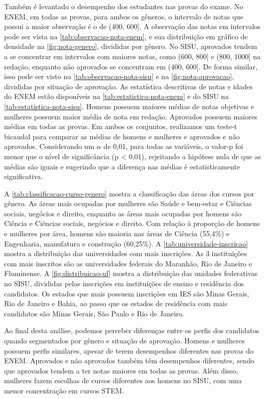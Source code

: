 Também é levantado o desempenho dos estudantes nas provas do exame. No ENEM, em todas as provas, para ambos os gêneros, o intervalo de notas que possui a maior observação é o de (400, 600]. A observação das notas em intervalos pode ser vista na \autoref{tab:observacao-nota-enem}, e sua distribuição em gráfico de densidade na \autoref{fig:nota-genero}, divididas por gênero. No SISU, aprovados tendem a se concentrar em intervalos com maiores notas, como (600, 800] e (800, 1000] na redação, enquanto não aprovados se concentram em (400, 600]. De forma similar, isso pode ser visto na \autoref{tab:observacao-nota-sisu} e na \autoref{fig:nota-aprovacao}, divididas por situação de aprovação. As estatística descritivas de notas e idades do ENEM estão disponíveis na \autoref{tab:estatistica-nota-enem} e do SISU na \autoref{tab:estatistica-nota-sisu}. Homens possuem maiores médias de notas objetivas e mulheres possuem maior média de nota em redação. Aprovados possuem maiores médias em todas as provas. Em ambos os conjuntos, realizamos um teste-t bicaudal para comparar as médias de homens e mulheres e aprovados e não aprovados. Considerando um $\alpha$ de 0,01, para todas as variáveis, o valor-p foi menor que o nível de significância (p < 0,01), rejeitando a hipótese nula de que as médias são iguais e sugerindo que a diferença nas médias é estatisticamente significativa.

A \autoref{tab:classificacao-curso-genero} mostra a classificação das áreas dos cursos por gênero. As áreas mais ocupadas por mulheres são Saúde e bem-estar e Ciências sociais, negócios e direito, enquanto as áreas mais ocupadas por homens são Ciência e Ciências sociais, negócios e direito. Com relação à proporção de homens e mulheres por área, homens são maioria nas áreas de Ciência (55,4\%) e Engenharia, manufatura e construção (60,25\%). A \autoref{tab:universidade-inscricao} mostra a distribuição das universidades com mais inscrições. As 3 instituições com mais inscritos são as universidades federais do Maranhão, Rio de Janeiro e Fluminense. A \autoref{fig:distribuicao-uf} mostra a distribuição das unidades federativas no SISU, divididas pelas inscrições em instituições de ensino e residência dos candidatos. Os estados que mais possuem inscrições em IES são Minas Gerais, Rio de Janeiro e Bahia, ao passo que os estados de residência com mais candidatos são Minas Gerais, São Paulo e Rio de Janeiro.

Ao final desta análise, podemos perceber diferenças entre os perfis dos candidatos quando segmentados por gênero e situação de aprovação. Homens e mulheres possuem perfis similares, apesar de terem desempenhos diferentes nas provas do ENEM. Aprovados e não aprovados também têm desempenhos diferentes, sendo que aprovados tendem a ter notas maiores em todas as provas. Além disso, mulheres fazem escolhas de cursos diferentes aos homens no SISU, com uma menor concentração em cursos STEM. 
   
